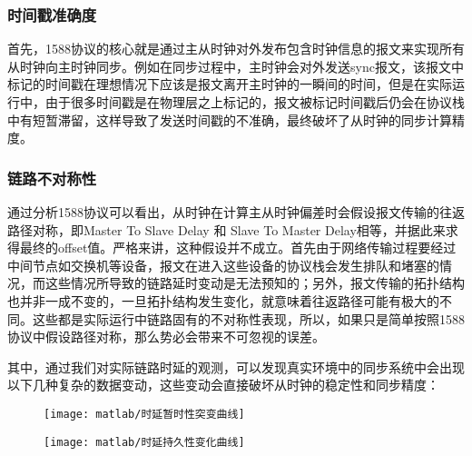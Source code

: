 \subsubsection{时间戳准确度}
\label{sec:1588_problem_timestamp_accu}
首先，1588协议的核心就是通过主从时钟对外发布包含时钟信息的报文来实现所有从时钟向主时钟同步。例如在同步过程中，主时钟会对外发送sync报文，该报文中标记的时间戳在理想情况下应该是报文离开主时钟的一瞬间的时间，但是在实际运行中，由于很多时间戳是在物理层之上标记的，报文被标记时间戳后仍会在协议栈中有短暂滞留，这样导致了发送时间戳的不准确，最终破坏了从时钟的同步计算精度。

\subsubsection{链路不对称性}
\label{sec:1588_problem_route_time_delay}
通过分析1588协议可以看出，从时钟在计算主从时钟偏差时会假设报文传输的往返路径对称，即Master To Slave Delay 和 Slave To Master Delay相等，并据此来求得最终的offset值。严格来讲，这种假设并不成立。首先由于网络传输过程要经过中间节点如交换机等设备，报文在进入这些设备的协议栈会发生排队和堵塞的情况，而这些情况所导致的链路延时变动是无法预知的；另外，报文传输的拓扑结构也并非一成不变的，一旦拓扑结构发生变化，就意味着往返路径可能有极大的不同。这些都是实际运行中链路固有的不对称性表现，所以，如果只是简单按照1588协议中假设路径对称，那么势必会带来不可忽视的误差。

其中，通过我们对实际链路时延的观测，可以发现真实环境中的同步系统中会出现以下几种复杂的数据变动，这些变动会直接破坏从时钟的稳定性和同步精度：
\begin{figure}[!hbp]
  \centering
  \begin{minipage}[b]{0.6\textwidth}
    \captionstyle{\centering}
    \centering
    \texttt{[image: matlab/时延暂时性突变曲线]}
  \end{minipage}     
\end{figure}

\begin{figure}[!hbp]
  \centering
  \begin{minipage}[b]{0.6\textwidth}
    \captionstyle{\centering}
    \centering
    \texttt{[image: matlab/时延持久性变化曲线]}
  \end{minipage}     
\end{figure}

